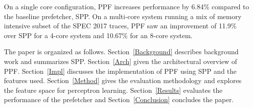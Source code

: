 On a single core configuration, PPF increases performance by 6.84\%
compared to the baseline prefetcher, SPP.  On a multi-core system running a
mix of memory intensive subset of the SPEC 2017 traces, PPF saw an improvement
of 11.9\% over SPP for a 4-core system and 10.67\% for an 8-core system.

The paper is organized as follows. Section~\ref{Background} describes
background work and summarizes SPP.  Section~\ref{Arch} given the 
architectural overview of PPF. Section~\ref{Impl} discusses the
implementation of PPF using SPP and the features used.
Section~\ref{Method} gives the evaluation methodology and explores the feature
space for perceptron learning.  Section~\ref{Results} evaluates the
performance of the prefetcher and Section~\ref{Conclusion} concludes the
paper.
